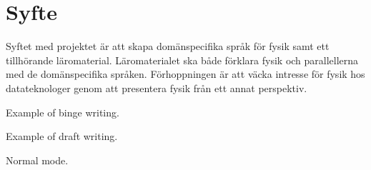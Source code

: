 \chapter{Syfte}

Syftet med projektet är att skapa domänspecifika språk för fysik samt ett
tillhörande läromaterial. Läromaterialet ska både förklara fysik och
parallellerna med de domänspecifika språken. Förhoppningen är att väcka intresse
för fysik hos datateknologer genom att presentera fysik från ett annat
perspektiv. 


\begin{binge}
  Example of binge writing.
\end{binge}

\begin{draft}
  Example of draft writing.
\end{draft}
Normal mode.
